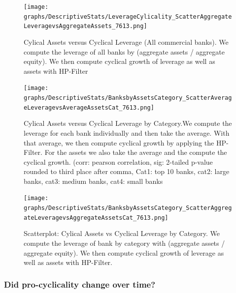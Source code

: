 \documentclass[12pt, a4paper]{article} %
\begin{document}
\begin{figure}[H]
\begin{minipage}{\textwidth}
\texttt{[image: graphs/DescriptiveStats/LeverageCylicality\_ScatterAggregateLeveragevsAggregateAssets\_7613.png]}
\caption[1]{Cylical Assets versus Cyclical Leverage (All commercial banks). We compute the leverage of all banks by (aggregate assets / aggregate equity). We then compute cyclical growth of leverage as well as assets with HP-Filter}
\label{fig:ScatterCyclicalAggregateLeverageAssets}
\end{minipage}
\end{figure}


\begin{figure}[H]
\begin{minipage}{\textwidth}
\texttt{[image: graphs/DescriptiveStats/BanksbyAssetsCategory\_ScatterAverageLeveragevsAverageAssetsCat\_7613.png]}
\caption[1]{Cylical Assets versus Cyclical Leverage by Category.We compute the leverage for each bank individually and then take the average. With that average, we then compute cyclical growth by applying the HP-Filter. For the assets we also take the average and the compute the cyclical growth. (corr: pearson correlation, sig: 2-tailed p-value rounded to third place after comma, Cat1: top 10 banks, cat2: large banks, cat3: medium banks, cat4: small banks}
\label{fig:ScatterAverageCyclicalLeverageAssetsbyCat}
\end{minipage}
\end{figure}

\begin{figure}[H]
\begin{minipage}{\textwidth}
\texttt{[image: graphs/DescriptiveStats/BanksbyAssetsCategory\_ScatterAggregateLeveragevsAggregateAssetsCat\_7613.png]}
\caption[1]{Scatterplot: Cylical Assets vs Cyclical Leverage by Category. We compute the leverage of bank by category with (aggregate assets / aggregate equity). We then compute cyclical growth of leverage as well as assets with HP-Filter.}
\label{fig:ScatterAggregateCyclicalLeverageAssetsbyCat}
\end{minipage}
\end{figure}

\subsubsection{Did pro-cyclicality change over time?}
\end{document}
